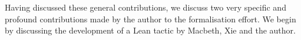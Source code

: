 

Having discussed these general contributions, we discuss two very specific and profound contributions made by the author to the formalisation effort. We begin by discussing the development of a Lean tactic by Macbeth, Xie and the author.